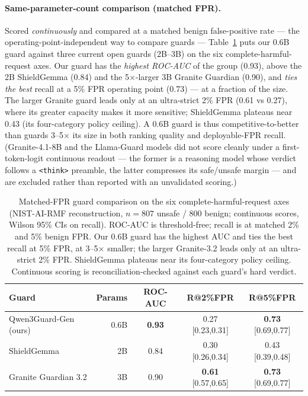 \documentclass[11pt]{article}
\begin{document}
\paragraph{Same-parameter-count comparison (matched FPR).} Scored \emph{continuously} and compared at a
matched benign false-positive rate --- the operating-point-independent way to compare guards ---
Table~\ref{tab:baselines} puts our 0.6B guard against three current open guards (2B--3B) on the six
complete-harmful-request axes. Our guard has the \emph{highest ROC-AUC} of the group (0.93), above the
2B ShieldGemma (0.84) and the 5$\times$-larger 3B Granite Guardian (0.90), and \emph{ties the best}
recall at a 5\% FPR operating point (0.73) --- at a fraction of the size. The larger Granite guard leads
only at an ultra-strict 2\% FPR (0.61 vs 0.27), where its greater capacity makes it more sensitive;
ShieldGemma plateaus near 0.43 (its four-category policy ceiling). A 0.6B guard is thus
competitive-to-better than guards 3--5$\times$ its size in both ranking quality and deployable-FPR recall.
(Granite-4.1-8B and the Llama-Guard models did not score cleanly under a first-token-logit continuous
readout --- the former is a reasoning model whose verdict follows a \texttt{<think>} preamble, the latter
compresses its safe/unsafe margin --- and are excluded rather than reported with an unvalidated scoring.)
\begin{table}[t]
\centering\small
\begin{tabular}{lrccc}
\toprule
Guard & Params & ROC-AUC & R@2\%FPR & R@5\%FPR \\
\midrule
Qwen3Guard-Gen (ours)  & 0.6B & \textbf{0.93} & 0.27 [0.23,0.31] & \textbf{0.73} [0.69,0.77] \\
ShieldGemma            & 2B   & 0.84 & 0.30 [0.26,0.34] & 0.43 [0.39,0.48] \\
Granite Guardian 3.2   & 3B   & 0.90 & \textbf{0.61} [0.57,0.65] & \textbf{0.73} [0.69,0.77] \\
\bottomrule
\end{tabular}
\caption{Matched-FPR guard comparison on the six complete-harmful-request axes (NIST-AI-RMF
reconstruction, $n{=}807$ unsafe / $800$ benign; continuous scores, Wilson 95\% CIs on recall). ROC-AUC
is threshold-free; recall is at matched 2\% and 5\% benign FPR. Our 0.6B guard has the highest AUC and
ties the best recall at 5\% FPR, at 3--5$\times$ smaller; the larger Granite-3.2 leads only at an
ultra-strict 2\% FPR. ShieldGemma plateaus near its four-category policy ceiling. Continuous scoring is
reconciliation-checked against each guard's hard verdict.}
\label{tab:baselines}
\end{table}
\end{document}
